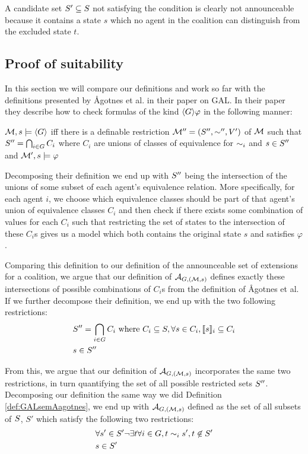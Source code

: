 A candidate set $S'\subseteq S$ not satisfying the condition is clearly not announceable because it contains a state $s$ which no agent in the coalition can distinguish from the excluded state $t$.

\subsection{Proof of suitability}

In this section we will compare our definitions and work so far with the definitions presented by Ågotnes et al. in their paper on GAL. In their paper they describe how to check formulas of the kind $\langle G\rangle\varphi$ in the following manner:

\begin{definition}
	\label{def:GALsemAagotnes}
	$\mathcal{M},s\models \langle G\rangle$ iff there is a definable restriction $\mathcal{M}'' = (S'',\sim'',V')$ of $\mathcal{M}$  such that $S'' = \bigcap_{i\in G}C_i$ where  $C_i$  are unions of classes of equivalence for $\sim_i$ and $s\in S''$ and $\mathcal{M}',s\models\varphi$
\end{definition}

Decomposing their definition we end up with $S''$ being the intersection of the unions of some subset of each agent's equivalence relation. More specifically, for each agent $i$, we choose which equivalence classes 
should be part of that agent's union of equivalence classes $C_i$ and then check if there exists some combination of values for each $C_i$ such that restricting the set of states to the intersection of these $C_i$s gives us a model which both contains the original state $s$ and satisfies $\varphi$.

Comparing this definition to our definition of the announceable set of extensions for a coalition, we argue that our definition of $\mathcal{A}_{G,(\mathcal{M},s)}$ defines exactly these intersections of possible combinations of $C_i$s from the definition of Ågotnes et al. If we further decompose their definition, we end up with the two following restrictions:
\begin{align}
	&S'' = \bigcap_{i\in G}C_i \textrm{ where } C_i \subseteq S, \forall s\in C_i, \llbracket s\rrbracket_i\subseteq C_i \\
	&s \in S''
\end{align}

From this, we argue that our definition of $\mathcal{A}_{G,(\mathcal{M},s)}$ incorporates the same two restrictions, in turn quantifying the set of all possible restricted sets $S''$. Decomposing our definition the same way we did Definition \ref{def:GALsemAagotnes}, we end up with $\mathcal{A}_{G,(\mathcal{M},s)}$ defined as the set of all subsets of $S$, $S'$ which satisfy the following two restrictions:
\begin{align}
	&\forall s'\in S' \neg\exists t\forall i \in G, t\sim_i s', t\not\in S' \\
	&s\in S'
\end{align}

